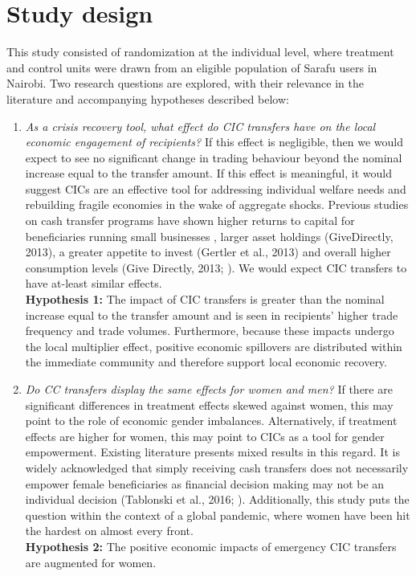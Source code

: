 \documentclass[12pt]{article}
\begin{document}
\section{Study design}
\label{sec:section5}
This study consisted of randomization at the individual level, where treatment and control units were drawn from an eligible population of Sarafu users in Nairobi. Two research questions are explored, with their relevance in the literature and accompanying hypotheses described below:

\begin{enumerate}
    \item \textit{As a crisis recovery tool, what effect do CIC transfers have on the local economic engagement of recipients?} If this effect is negligible, then we would expect to see no significant change in trading behaviour beyond the nominal increase equal to the transfer amount. If this effect is meaningful, it would suggest CICs are an effective tool for addressing individual welfare needs and rebuilding fragile economies in the wake of aggregate shocks. Previous studies on cash transfer programs have shown higher returns to capital for beneficiaries running small businesses \citep{de2007returns}, larger asset holdings (GiveDirectly, 2013), a greater appetite to invest (Gertler et al., 2013) and overall higher consumption levels (Give Directly, 2013; \citep{egger2019general}). We would expect CIC transfers to have at-least similar effects.\\
    \textbf{Hypothesis 1:} The impact of CIC transfers is greater than the nominal increase equal to the transfer amount and is seen in recipients’ higher trade frequency and trade volumes. Furthermore, because these impacts undergo the local multiplier effect, positive economic spillovers are distributed within the immediate community and therefore support local economic recovery.

    \item \textit{Do CC transfers display the same effects for women and men?} If there are significant differences in treatment effects skewed against women, this may point to the role of economic gender imbalances. Alternatively, if treatment effects are higher for women, this may point to CICs as a tool for gender empowerment. Existing literature presents mixed results in this regard. It is widely acknowledged that simply receiving cash transfers does not necessarily empower female beneficiaries as financial decision making may not be an individual decision (Tablonski et al., 2016; \citep{hagen2017impact}). Additionally, this study puts the question within the context of a global pandemic, where women have been hit the hardest on almost every front.\\
    \textbf{Hypothesis 2:} The positive economic impacts of emergency CIC transfers are augmented for women.
\end{enumerate}
\end{document}
